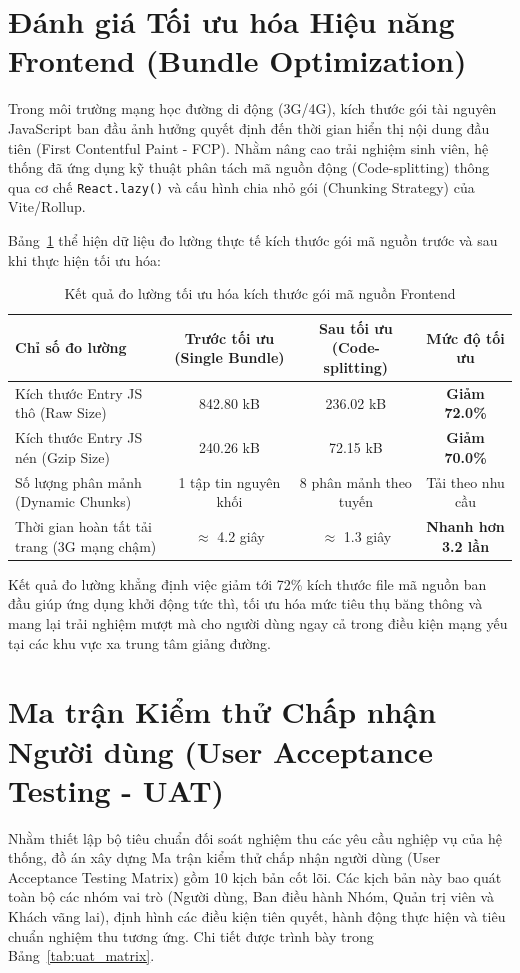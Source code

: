 \section{Đánh giá Tối ưu hóa Hiệu năng Frontend (Bundle Optimization)}
Trong môi trường mạng học đường di động (3G/4G), kích thước gói tài nguyên JavaScript ban đầu ảnh hưởng quyết định đến thời gian hiển thị nội dung đầu tiên (First Contentful Paint - FCP). Nhằm nâng cao trải nghiệm sinh viên, hệ thống đã ứng dụng kỹ thuật phân tách mã nguồn động (Code-splitting) thông qua cơ chế \texttt{React.lazy()} và cấu hình chia nhỏ gói (Chunking Strategy) của Vite/Rollup. 

Bảng~\ref{tab:bundle_optimization} thể hiện dữ liệu đo lường thực tế kích thước gói mã nguồn trước và sau khi thực hiện tối ưu hóa:

\begin{table}[H]
\centering
\small
\begin{tabular}{|l|c|c|c|}
\hline
\textbf{Chỉ số đo lường} & \textbf{Trước tối ưu (Single Bundle)} & \textbf{Sau tối ưu (Code-splitting)} & \textbf{Mức độ tối ưu} \\ \hline
Kích thước Entry JS thô (Raw Size) & 842.80 kB & 236.02 kB & \textbf{Giảm 72.0\%} \\ \hline
Kích thước Entry JS nén (Gzip Size) & 240.26 kB & 72.15 kB & \textbf{Giảm 70.0\%} \\ \hline
Số lượng phân mảnh (Dynamic Chunks) & 1 tập tin nguyên khối & 8 phân mảnh theo tuyến & Tải theo nhu cầu \\ \hline
Thời gian hoàn tất tải trang (3G mạng chậm) & $\approx$ 4.2 giây & $\approx$ 1.3 giây & \textbf{Nhanh hơn 3.2 lần} \\ \hline
\end{tabular}
\caption{Kết quả đo lường tối ưu hóa kích thước gói mã nguồn Frontend}
\label{tab:bundle_optimization}
\end{table}

Kết quả đo lường khẳng định việc giảm tới 72\% kích thước file mã nguồn ban đầu giúp ứng dụng khởi động tức thì, tối ưu hóa mức tiêu thụ băng thông và mang lại trải nghiệm mượt mà cho người dùng ngay cả trong điều kiện mạng yếu tại các khu vực xa trung tâm giảng đường.

\section{Ma trận Kiểm thử Chấp nhận Người dùng (User Acceptance Testing - UAT)}
Nhằm thiết lập bộ tiêu chuẩn đối soát nghiệm thu các yêu cầu nghiệp vụ của hệ thống, đồ án xây dựng Ma trận kiểm thử chấp nhận người dùng (User Acceptance Testing Matrix) gồm 10 kịch bản cốt lõi. Các kịch bản này bao quát toàn bộ các nhóm vai trò (Người dùng, Ban điều hành Nhóm, Quản trị viên và Khách vãng lai), định hình các điều kiện tiên quyết, hành động thực hiện và tiêu chuẩn nghiệm thu tương ứng. Chi tiết được trình bày trong Bảng~\ref{tab:uat_matrix}.

